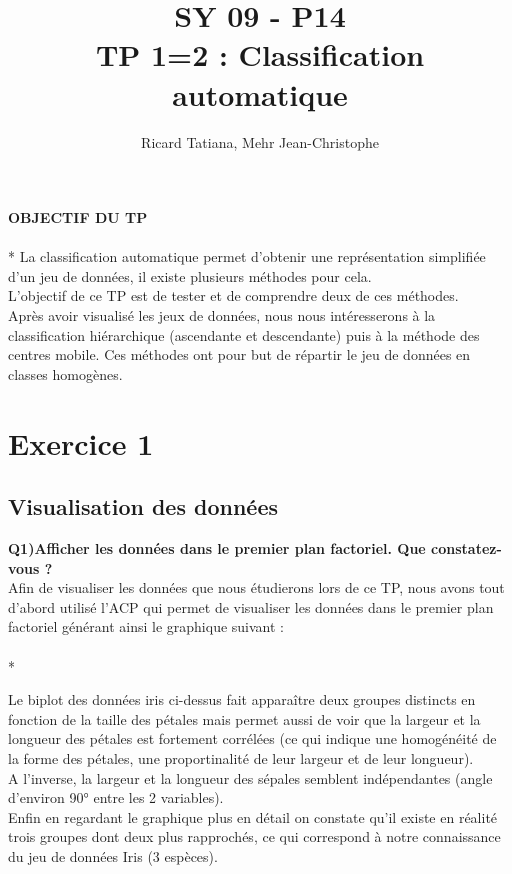 \documentclass[a4paper, 8pt]{article}
\title{SY 09 - P14 \\TP 1=2 : Classification automatique}
\author{Ricard Tatiana, Mehr Jean-Christophe}
\date{}
\begin{document}
\maketitle

\textbf{ OBJECTIF DU TP} \\
\\* La classification automatique permet d’obtenir une représentation simplifiée d’un jeu de données, il existe plusieurs méthodes pour cela. \\L’objectif de ce TP est de tester et de comprendre deux de ces méthodes.\\ Après avoir visualisé les jeux de données, nous nous intéresserons à la classification hiérarchique (ascendante et descendante) puis à la méthode des centres mobile. Ces méthodes ont pour but de répartir le jeu de données en classes homogènes.


\section{Exercice 1}
\subsection{Visualisation des données}


\newline\textbf{Q1)Afficher les données dans le premier plan factoriel. Que constatez-vous ?}
\\Afin de visualiser les données que nous étudierons lors de ce TP, nous avons tout d’abord utilisé l’ACP qui permet de visualiser les données dans le premier plan factoriel générant ainsi le graphique suivant :\\ \\*

Le biplot des données iris ci-dessus fait apparaître deux groupes distincts en fonction de la taille des pétales mais permet aussi de voir que la largeur et la longueur des pétales est fortement corrélées (ce qui indique une homogénéité de la forme des pétales, une proportinalité de leur largeur et de leur longueur).\\
A l’inverse, la largeur et la longueur des sépales semblent indépendantes (angle d’environ  90° entre les 2 variables).\\
Enfin en regardant le graphique plus en détail on constate qu’il existe en réalité trois groupes  dont deux plus rapprochés, ce qui correspond à notre connaissance du jeu de données Iris (3 espèces).
\end{document}
